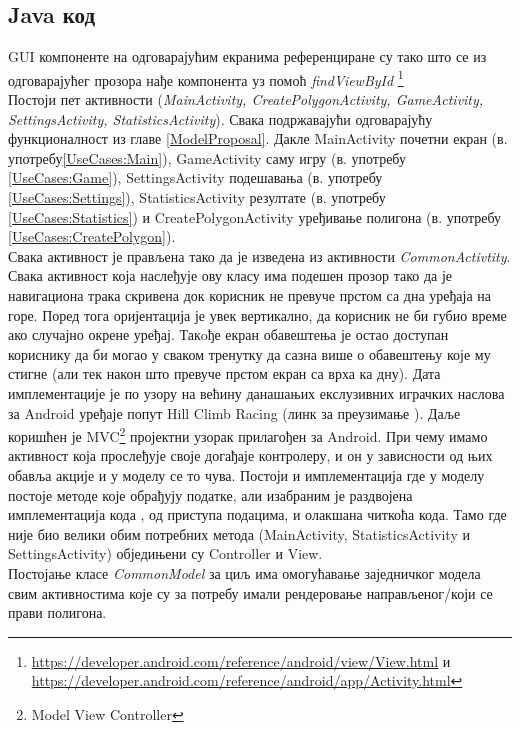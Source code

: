 \subsection{Java код}
GUI компоненте на одговарајућим екранима референциране су тако што се из одговарајућег прозора нађе компонента уз помоћ \emph{findViewById} \footnote{\url{https://developer.android.com/reference/android/view/View.html} и \url{https://developer.android.com/reference/android/app/Activity.html}}
\\ \indent 
Постоји пет активности (\emph{MainActivity, CreatePolygonActivity, GameActivity, SettingsActivity, StatisticsActivity}). Свака подржавајући одговарајућу функционалност из главе \ref{ModelProposal}. Дакле MainActivity почетни екран (в. употребу\ref{UseCases:Main}), GameActivity  саму игру (в. употребу \ref{UseCases:Game}), SettingsActivity подешавања (в. употребу \ref{UseCases:Settings}), StatisticsActivity резултате (в. употребу \ref{UseCases:Statistics}) и CreatePolygonActivity уређивање полигона (в. употребу \ref{UseCases:CreatePolygon}).
\\ \indent 
Свака активност је прављена тако да је изведена из активности \emph{CommonActivtity}. Свака активност која наслеђује ову класу има подешен прозор тако да је навигациона трака скривена док корисник не превуче прстом са дна уређаја на горе. Поред тога оријентација је увек вертикално, да корисник не би губио време ако случајно окрене уређај. Такoђе екран обавештења је остао доступан кориснику да би могао у сваком тренутку да сазна више о обавештењу које му стигне (али тек након што превуче прстом екран са врха ка дну).
 Дата имплементације је по узору на већину данашањих екслузивних играчких наслова за Android уређаје попут Hill Climb Racing (линк за преузимање \cite{HillCR}). Даље коришћен је MVC\footnote{Model View Controller} пројектни узорак прилагођен за Android. При чему имамо активност која прослеђује своје догађаје контролеру, и он у зависности од њих обавља акције и у моделу се то чува. Постоји и имплементација где у моделу постоје методе које обрађују податке, али изабраним је раздвојена имплементација кода , од приступа подацима, и олакшана читкоћа кода.  Тамо где није био велики обим потребних метода (MainActivity, StatisticsActivity и SettingsActivity) обједињени су Controller и View. 
 \\ \indent
 Постојање класе \emph{CommonModel} за циљ има омогућавање заједничког модела свим активностима које су за потребу имали рендеровање направљеног/који се прави полигона. 
 \\ \indent
